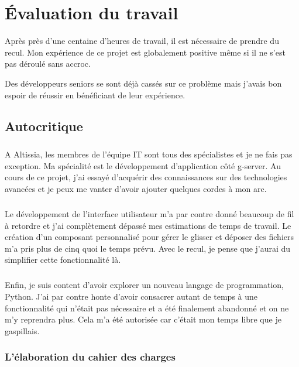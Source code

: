 \chapter{Évaluation du travail}
\label{ch:evaluation}
Après près d'une centaine d'heures de travail, il est nécessaire de prendre du recul.
Mon expérience de ce projet est globalement positive même si il ne s'est pas déroulé sans accroc.

Des développeurs seniors se sont déjà cassés sur ce problème mais j'avais bon espoir de réussir en bénéficiant de leur expérience.

\section{Autocritique}
\label{sec:autocritic}

\paragraph{}
A Altissia, les membres de l'équipe IT sont tous des spécialistes et je ne fais pas exception.
Ma spécialité est le développement d'application côté \gls{g-server}.
Au cours de ce projet, j'ai essayé d'acquérir des connaissances sur des technologies avancées et je peux me vanter d'avoir ajouter quelques cordes à mon arc.

\paragraph{}
Le développement de l'interface utilisateur m'a par contre donné beaucoup de fil à retordre et j'ai complètement dépassé mes estimations de temps de travail.
Le création d'un composant personnalisé pour gérer le glisser et déposer des fichiers m'a pris plus de cinq quoi le temps prévu.
Avec le recul, je pense que j'aurai du simplifier cette fonctionnalité là.

\paragraph{}
Enfin, je suis content d'avoir explorer un nouveau langage de programmation, Python.
J'ai par contre honte d'avoir consacrer autant de temps à une fonctionnalité qui n'était pas nécessaire et a été finalement abandonné et on ne m'y reprendra plus.
Cela m'a été autorisée car c'était mon temps libre que je gaspillais.

\subsection{L'élaboration du cahier des charges}
\label{subsec:specs}

